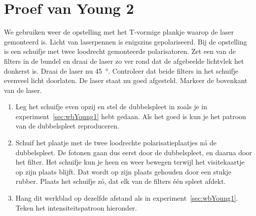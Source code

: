 \documentclass[../../main.tex]{subfiles}
\begin{document}
\onlyinsubfile{
\setcounter{chapter}{0}
}
\notinsubfile{}
\section{Proef van Young 2}\label{sec:wbYoung2}

We gebruiken weer de opstelling met het T-vormige plankje waarop de laser gemonteerd is. Licht van laserpennen is enigszins gepolariseerd. Bij de opstelling is een schuifje met twee loodrecht gemonteerde polarisatoren. Zet een van de filters in de bundel en draai de laser zo ver rond dat de afgebeelde lichtvlek het donkerst is. Draai de laser nu \SI{45}{\degree}. Controleer dat beide filters in het schuifje evenveel licht doorlaten. De laser staat nu goed afgesteld. Markeer de bovenkant van de laser.

\begin{enumerate}
\item Leg het schuifje even opzij en stel de dubbelspleet in zoals je in experiment~\ref{sec:wbYoung1} hebt gedaan. Als het goed is kun je het patroon van de dubbelspleet reproduceren.
\item Schuif het plaatje met de twee loodrechte polarisatieplaatjes n\'a de dubbelspleet. De fotonen gaan dus eerst door de dubbelspleet, en daarna door het filter. Het schuifje kun je heen en weer bewegen terwijl het visitekaartje op zijn plaats blijft. Dat wordt op zijn plaats gehouden door een stukje rubber. Plaats het schuifje z\'o, dat elk van de filters \'e\'en spleet afdekt.
\item Hang dit werkblad op dezelfde afstand als in experiment~\ref{sec:wbYoung1}. Teken het intensiteitspatroon hieronder.
\end{enumerate}
\noindent{}%
\end{document}
